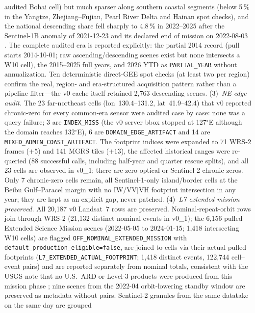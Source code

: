 audited Bohai cell) but much sparser along southern coastal segments
(below 5\,\% in the Yangtze, Zhejiang--Fujian, Pearl River Delta and
Hainan spot checks), and the national descending share fell sharply
to 4.8\,\% in 2022--2025 after the Sentinel-1B anomaly of 2021-12-23
and its declared end of mission on 2022-08-03
\citep{copernicus2022s1b}. The complete audited era is reported
explicitly: the partial 2014 record (pull starts 2014-10-01; raw
ascending/descending scenes exist but none intersects a W10 cell),
the 2015--2025 full years, and 2026 YTD as \texttt{PARTIAL\_YEAR}
without annualization. Ten deterministic direct-GEE spot checks
(at least two per region) confirm the real, region- and era-structured
acquisition pattern rather than a pipeline filter---the v0 cache itself
retained 2{,}763 descending scenes. (3)~\emph{NE edge audit.} The 23
far-northeast cells (lon~130.4--131.2, lat~41.9--42.4) that v0
reported chronic-zero for every common-era sensor were audited case by
case: none was a query failure; 3 are \texttt{INDEX\_MISS} (the v0
server bbox stopped at 127$^{\circ}$E although the domain reaches
132$^{\circ}$E), 6 are \texttt{DOMAIN\_EDGE\_ARTIFACT} and 14 are
\texttt{MIXED\_ADMIN\_COAST\_ARTIFACT}. The footprint indices were
expanded to 71 WRS-2 frames ($+5$) and 141 MGRS tiles ($+13$), the
affected historical ranges were re-queried (88 successful calls,
including half-year and quarter rescue splits), and all 23 cells are
observed in v0\_1; there are zero optical or Sentinel-2 chronic zeros.
Only 7 chronic-zero cells remain, all Sentinel-1-only island/border
cells at the Beibu Gulf--Paracel margin with no IW/VV$|$VH footprint
intersection in any year; they are kept as an explicit gap, never
patched. (4)~\emph{L7 extended mission preserved.} All 20{,}187 v0
Landsat~7 rows are preserved. Nominal-repeat-orbit rows join through
WRS-2 (21{,}132 distinct nominal events in v0\_1); the 6{,}156 pulled
Extended Science Mission scenes (2022-05-05 to 2024-01-15; 1{,}418
intersecting W10 cells) are flagged
\texttt{OFF\_NOMINAL\_EXTENDED\_MISSION} with
\texttt{default\_production\_eligible=false}, are joined to cells via
their actual pulled footprints
(\texttt{L7\_EXTENDED\_ACTUAL\_FOOTPRINT}; 1{,}418 distinct events,
122{,}744 cell--event pairs) and are reported separately from nominal
totals, consistent with the USGS note that no U.S.\ ARD or Level-3
products were produced from this mission phase
\citep{usgs2024l7extended}; nine scenes from the 2022-04 orbit-lowering
standby window are preserved as metadata without pairs.
Sentinel-2 granules from the same datatake on the same day are grouped
